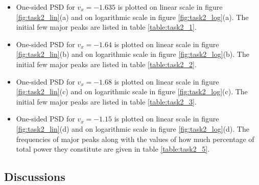 \documentclass[a4paper]{article}
\begin{document}
		\begin{itemize}
			
			\item One-sided PSD for \(v_x = -1.635\) is plotted on linear scale in figure \ref{fig:task2_lin}(a) and on logarithmic scale in figure \ref{fig:task2_log}(a). The initial few major peaks are listed in table \ref{table:task2_1}.
			
			\item One-sided PSD for \(v_x = -1.64\) is plotted on linear scale in figure \ref{fig:task2_lin}(b) and on logarithmic scale in figure \ref{fig:task2_log}(b). The initial few major peaks are listed in table \ref{table:task2_2}.
			
			\item One-sided PSD for \(v_x = -1.68\) is plotted on linear scale in figure \ref{fig:task2_lin}(c) and on logarithmic scale in figure \ref{fig:task2_log}(c). The initial few major peaks are listed in table \ref{table:task2_3}.	
			
			\item One-sided PSD for \(v_x = -1.15\) is plotted on linear scale in figure \ref{fig:task2_lin}(d) and on logarithmic scale in figure \ref{fig:task2_log}(d). The frequencies of major peaks along with the values of how much percentage of total power they constitute are given in table \ref{table:task2_5}.
						
		\end{itemize}
		
	
		\subsection{Discussions} \label{discussions2}
		
\end{document}
